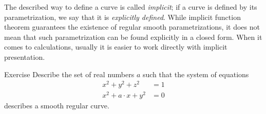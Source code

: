 The described way to define a curve is called \emph{implicit};
if a curve is defined by its parametrization, we say that it is \emph{explicitly defined}.
While implicit function theorem guarantees the existence of regular smooth parametrizations, it does not mean that such parametrization can be found explicitly in a closed form. 
When it comes to calculations, usually it is easier to work directly with implicit presentation. 


\begin{thm}{Exercise}\label{ex:viviani}
Describe the set of real numbers $a$
such that the system of equations
\begin{align*}
x^2+y^2+z^2&=1
\\
x^2+a\cdot x+y^2&=0
\end{align*}
describes a smooth regular curve.
\end{thm}



